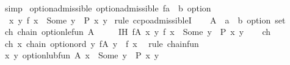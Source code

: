 \begin{isabellebody}
\ simp\isanewline
{}\isamarkupfalse%
%
\endisatagproof
{\isafoldproof}%
%
\isadelimproof
\isanewline
%
\endisadelimproof
\isanewline
{}\isamarkupfalse%
\ option{\isacharunderscore}{\kern0pt}admissible{\isacharcolon}{\kern0pt}\ {\isachardoublequoteopen}option{\isachardot}{\kern0pt}admissible\ {\isacharparenleft}{\kern0pt}{\isacharpercent}{\kern0pt}{\isacharparenleft}{\kern0pt}f{\isacharcolon}{\kern0pt}{\isacharcolon}{\kern0pt}{\isacharprime}{\kern0pt}a\ {\isasymRightarrow}\ {\isacharprime}{\kern0pt}b\ option{\isacharparenright}{\kern0pt}{\isachardot}{\kern0pt}\isanewline
\ \ {\isacharparenleft}{\kern0pt}{\isasymforall}x\ y{\isachardot}{\kern0pt}\ f\ x\ {\isacharequal}{\kern0pt}\ Some\ y\ {\isasymlongrightarrow}\ P\ x\ y{\isacharparenright}{\kern0pt}{\isacharparenright}{\kern0pt}{\isachardoublequoteclose}\isanewline
%
\isadelimproof
%
\endisadelimproof
%
\isatagproof
{}\isamarkupfalse%
\ {\isacharparenleft}{\kern0pt}rule\ ccpo{\isachardot}{\kern0pt}admissibleI{\isacharparenright}{\kern0pt}\isanewline
\ \ \isamarkupfalse%
\ A\ {\isacharcolon}{\kern0pt}{\isacharcolon}{\kern0pt}\ {\isachardoublequoteopen}{\isacharparenleft}{\kern0pt}{\isacharprime}{\kern0pt}a\ {\isasymRightarrow}\ {\isacharprime}{\kern0pt}b\ option{\isacharparenright}{\kern0pt}\ set{\isachardoublequoteclose}\isanewline
\ \ \isamarkupfalse%
\ ch{\isacharcolon}{\kern0pt}\ {\isachardoublequoteopen}chain\ option{\isachardot}{\kern0pt}le{\isacharunderscore}{\kern0pt}fun\ A{\isachardoublequoteclose}\isanewline
\ \ \ \ \ IH{\isacharcolon}{\kern0pt}\ {\isachardoublequoteopen}{\isasymforall}f{\isasymin}A{\isachardot}{\kern0pt}\ {\isasymforall}x\ y{\isachardot}{\kern0pt}\ f\ x\ {\isacharequal}{\kern0pt}\ Some\ y\ {\isasymlongrightarrow}\ P\ x\ y{\isachardoublequoteclose}\isanewline
\ \ \isamarkupfalse%
\ ch\ \isamarkupfalse%
\ ch{\isacharprime}{\kern0pt}{\isacharcolon}{\kern0pt}\ {\isachardoublequoteopen}{\isasymAnd}x{\isachardot}{\kern0pt}\ chain\ option{\isacharunderscore}{\kern0pt}ord\ {\isacharbraceleft}{\kern0pt}y{\isachardot}{\kern0pt}\ {\isasymexists}f{\isasymin}A{\isachardot}{\kern0pt}\ y\ {\isacharequal}{\kern0pt}\ f\ x{\isacharbraceright}{\kern0pt}{\isachardoublequoteclose}\ \isamarkupfalse%
\ {\isacharparenleft}{\kern0pt}rule\ chain{\isacharunderscore}{\kern0pt}fun{\isacharparenright}{\kern0pt}\isanewline
\ \ \isamarkupfalse%
\ {\isachardoublequoteopen}{\isasymforall}x\ y{\isachardot}{\kern0pt}\ option{\isachardot}{\kern0pt}lub{\isacharunderscore}{\kern0pt}fun\ A\ x\ {\isacharequal}{\kern0pt}\ Some\ y\ {\isasymlongrightarrow}\ P\ x\ y{\isachardoublequoteclose}\isanewline

\end{isabellebody}
